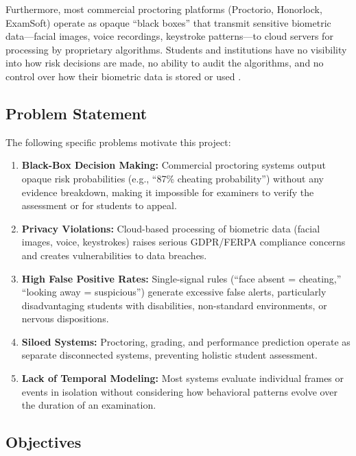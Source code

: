 \documentclass{article}
\begin{document}
Furthermore, most commercial proctoring platforms (Proctorio, Honorlock, ExamSoft) operate as opaque ``black boxes'' that transmit sensitive biometric data---facial images, voice recordings, keystroke patterns---to cloud servers for processing by proprietary algorithms. Students and institutions have no visibility into how risk decisions are made, no ability to audit the algorithms, and no control over how their biometric data is stored or used \cite{digital_proctoring_2024}.

\subsection{Problem Statement}

The following specific problems motivate this project:

\begin{enumerate}[label=\textbf{P\arabic*.}]
    \item \textbf{Black-Box Decision Making:} Commercial proctoring systems output opaque risk probabilities (e.g., ``87\% cheating probability'') without any evidence breakdown, making it impossible for examiners to verify the assessment or for students to appeal.

    \item \textbf{Privacy Violations:} Cloud-based processing of biometric data (facial images, voice, keystrokes) raises serious GDPR/FERPA compliance concerns and creates vulnerabilities to data breaches.

    \item \textbf{High False Positive Rates:} Single-signal rules (``face absent = cheating,'' ``looking away = suspicious'') generate excessive false alerts, particularly disadvantaging students with disabilities, non-standard environments, or nervous dispositions.

    \item \textbf{Siloed Systems:} Proctoring, grading, and performance prediction operate as separate disconnected systems, preventing holistic student assessment.

    \item \textbf{Lack of Temporal Modeling:} Most systems evaluate individual frames or events in isolation without considering how behavioral patterns evolve over the duration of an examination.
\end{enumerate}

\subsection{Objectives}
\end{document}
